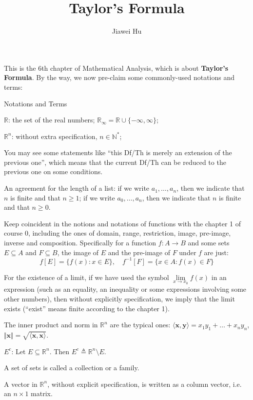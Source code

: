 \documentclass{article}
\title{\LARGE \textbf{Taylor's Formula}}
\author{\large Jiawei Hu}
\begin{document}
\maketitle

This is the 6th chapter of Mathematical Analysis, which is about \textbf{Taylor's Formula}. By the way, we now pre-claim some commonly-used notations and terms:
\begin{Df}{Notations and Terms}
    \begin{compactenum}
        \item $\mathbb{R}$: the set of the real numbers; $\mathbb{R}_\infty = \mathbb{R}\cup\{-\infty, \infty\}$;
        \item $\mathbb{R}^n$: without extra specification, $n\in\mathbb{N}^\ast$; 
        \item You may see some statements like ``this Df/Th is merely an extension of the previous one'', which means that the current Df/Th can be reduced to the previous one on some conditions.
        \item An agreement for the length of a list: if we write $a_1, \dots, a_n$, then we indicate that $n$ is finite and that $n\geq 1$; if we write $a_0, \dots, a_n$, then we indicate that $n$ is finite and that $n\geq 0$.
        \item Keep coincident in the notions and notations of functions with the chapter 1 of course 0, including the ones of domain, range, restriction, image, pre-image, inverse and composition. Specifically for a function $f: A\rightarrow B$ and some sets $E\subseteq A$ and $F\subseteq B$, the image of $E$ and the pre-image of $F$ under $f$ are just:
        $$f[E] = \{f(x): x\in E\},\quad f^{-1}[F] = \{x\in A: f(x)\in F\}$$
        \item For the existence of a limit, if we have used the symbol $\lim\limits_{x\to x_0} f(x)$ in an expression (such as an equality, an inequality or some expressions involving some other numbers), then without explicitly specification, we imply that the limit exists (``exist'' means finite according to the chapter 1).
        \item The inner product and norm in $\mathbb{R}^n$ are the typical ones: $\langle \pmb{x}, \pmb{y}\rangle = x_1y_1 + \dots + x_ny_n$, $\Vert \pmb{x}\Vert = \sqrt{\langle \pmb{x}, \pmb{x}\rangle}$.
        \item $E^c$: Let $E\subseteq\mathbb{R}^n$. Then $E^c\triangleq \mathbb{R}^n\setminus E$.
        \item A set of sets is called a collection or a family.
        \item A vector in $\mathbb{R}^n$, without explicit specification, is written as a column vector, i.e. an $n\times 1$ matrix.
    \end{compactenum}
\end{Df}
\end{document}
